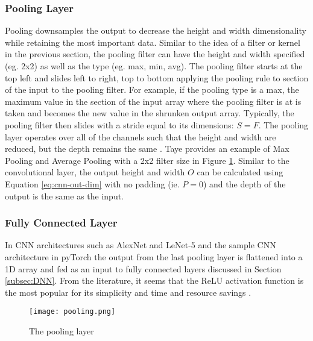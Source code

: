 \subsubsection{Pooling Layer}
Pooling downsamples the output to decrease the height and width dimensionality while retaining the most important data. Similar to the idea of a filter or kernel in the previous section, the pooling filter can have the height and width specified (eg. 2x2) as well as the type (eg. max, min, avg). The pooling filter starts at the top left and slides left to right, top to bottom applying the pooling rule to section of the input to the pooling filter. For example, if the pooling type is a max, the maximum value in the section of the input array where the pooling filter is at is taken and becomes the new value in the shrunken output array. Typically, the pooling filter then slides with a stride equal to its dimensions: $S=F$. The pooling layer operates over all of the channels such that the height and width are reduced, but the depth remains the same \cite{tayeTheoreticalUnderstandingConvolutional2023}. Taye provides an example of Max Pooling and Average Pooling with a 2x2 filter size in Figure \ref{fig:cnn-pooling}. Similar to the convolutional layer, the output height and width $O$ can be calculated using Equation \ref{eq:cnn-out-dim} with no padding (ie. $P=0$) and the depth of the output is the same as the input. 

\subsubsection{Fully Connected Layer}
In CNN architectures such as AlexNet and LeNet-5 \cite{swapnaCNNArchitecturesAlex2020} and the sample CNN architecture in pyTorch \cite{TrainingClassifierPyTorch} the output from the last pooling layer is flattened into a 1D array and fed as an input to fully connected layers discussed in Section \ref{subsec:DNN}. From the literature, it seems that the ReLU activation function is the most popular for its simplicity and time and resource savings \cite{tayeTheoreticalUnderstandingConvolutional2023,swapnaCNNArchitecturesAlex2020,prakashAdvancedDeepLearning2021}.

\begin{figure}[ht]
    \centering
    \texttt{[image: pooling.png]}
    \caption{The pooling layer \cite{tayeTheoreticalUnderstandingConvolutional2023}}
    \label{fig:cnn-pooling}
\end{figure}


